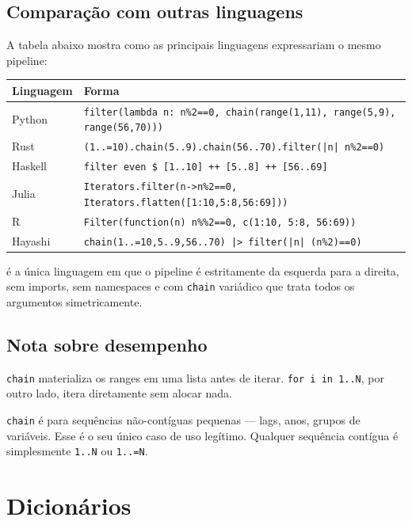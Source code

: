 \subsection{Comparação com outras linguagens}

A tabela abaixo mostra como as principais linguagens expressariam o mesmo pipeline:

\begin{center}
\begin{tabular}{ll}
\toprule
\textbf{Linguagem} & \textbf{Forma} \\
\midrule
Python  & \texttt{filter(lambda n: n\%2==0, chain(range(1,11), range(5,9), range(56,70)))} \\
Rust    & \texttt{(1..=10).chain(5..9).chain(56..70).filter(|n| n\%2==0)} \\
Haskell & \texttt{filter even \$ [1..10] ++ [5..8] ++ [56..69]} \\
Julia   & \texttt{Iterators.filter(n->n\%2==0, Iterators.flatten([1:10,5:8,56:69]))} \\
R       & \texttt{Filter(function(n) n\%\%2==0, c(1:10, 5:8, 56:69))} \\
\midrule
Hayashi & \texttt{chain(1..=10,5..9,56..70) |> filter(|n| (n\%2)==0)} \\
\bottomrule
\end{tabular}
\end{center}

\hayashi{} é a única linguagem em que o pipeline é estritamente da esquerda para a
direita, sem imports, sem namespaces e com \lstinline{chain} variádico que trata
todos os argumentos simetricamente.

\subsection{Nota sobre desempenho}

\lstinline{chain} materializa os ranges em uma lista antes de iterar.
\lstinline{for i in 1..N}, por outro lado, itera diretamente sem alocar nada.

\lstinline{chain} é para sequências não-contíguas pequenas — lags, anos, grupos de
variáveis. Esse é o seu único caso de uso legítimo. Qualquer sequência contígua é
simplesmente \lstinline{1..N} ou \lstinline{1..=N}.

\section{Dicionários}

